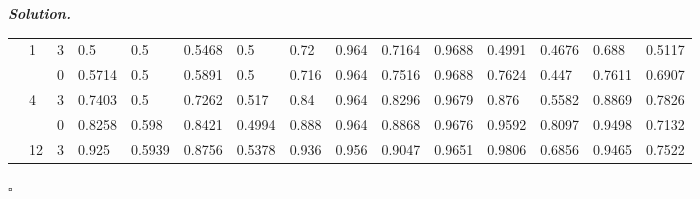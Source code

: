\documentclass[10pt]{article}
\newenvironment{solution}[1][\it{Solution}]{\textbf{#1. } }{$\square$}
\begin{document}
\begin{solution}
\begin{table}[H]
\begin{tabular}{|l|l|l|l|l|l|l|l|l|l|l|l|l|l|l|}
\rowcolor[HTML]{EFEFEF} 
\cellcolor[HTML]{9AFF99}                        & \multirow{-2}{*}{\cellcolor[HTML]{FE0000}1}  & \cellcolor[HTML]{F8A102}3                    & 0.5                            & 0.5                            & 0.5468                         & 0.5                            & \cellcolor[HTML]{C0C0C0}0.72   & \cellcolor[HTML]{C0C0C0}0.964  & \cellcolor[HTML]{C0C0C0}0.7164 & \cellcolor[HTML]{C0C0C0}0.9688 & 0.4991                         & 0.4676                         & 0.688                          & 0.5117                         \\ \cline{2-15} 
\rowcolor[HTML]{C0C0C0} 
\cellcolor[HTML]{9AFF99}                        & \cellcolor[HTML]{FD6864}                     & \cellcolor[HTML]{FFCE93}0                    & 0.5714                         & 0.5                            & 0.5891                         & 0.5                            & \cellcolor[HTML]{EFEFEF}0.716  & \cellcolor[HTML]{EFEFEF}0.964  & \cellcolor[HTML]{EFEFEF}0.7516 & \cellcolor[HTML]{EFEFEF}0.9688 & 0.7624                         & 0.447                          & 0.7611                         & 0.6907                         \\ \cline{3-15} 
\rowcolor[HTML]{EFEFEF} 
\cellcolor[HTML]{9AFF99}                        & \multirow{-2}{*}{\cellcolor[HTML]{FD6864}4}  & \cellcolor[HTML]{F8A102}3                    & 0.7403                         & 0.5                            & 0.7262                         & 0.517                          & \cellcolor[HTML]{C0C0C0}0.84   & \cellcolor[HTML]{C0C0C0}0.964  & \cellcolor[HTML]{C0C0C0}0.8296 & \cellcolor[HTML]{C0C0C0}0.9679 & 0.876                          & 0.5582                         & 0.8869                         & 0.7826                         \\ \cline{2-15} 
\rowcolor[HTML]{C0C0C0} 
\cellcolor[HTML]{9AFF99}                        & \cellcolor[HTML]{FFCCC9}                     & \cellcolor[HTML]{FFCE93}0                    & 0.8258                         & 0.598                          & 0.8421                         & 0.4994                         & \cellcolor[HTML]{EFEFEF}0.888  & \cellcolor[HTML]{EFEFEF}0.964  & \cellcolor[HTML]{EFEFEF}0.8868 & \cellcolor[HTML]{EFEFEF}0.9676 & 0.9592                         & 0.8097                         & 0.9498                         & 0.7132                         \\ \cline{3-15} 
\rowcolor[HTML]{EFEFEF} 
\multirow{-6}{*}{\cellcolor[HTML]{9AFF99}250}   & \multirow{-2}{*}{\cellcolor[HTML]{FFCCC9}12} & \cellcolor[HTML]{F8A102}3                    & 0.925                          & 0.5939                         & 0.8756                         & 0.5378                         & \cellcolor[HTML]{C0C0C0}0.936  & \cellcolor[HTML]{C0C0C0}0.956  & \cellcolor[HTML]{C0C0C0}0.9047 & \cellcolor[HTML]{C0C0C0}0.9651 & 0.9806                         & 0.6856                         & 0.9465                         & 0.7522                         \\ \hline

\end{tabular}
\end{table}
\end{solution}
\end{document}
